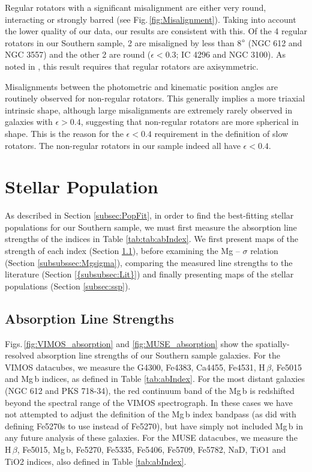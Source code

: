 			Regular rotators with a significant misalignment are either very round, interacting or strongly barred (see Fig.\,\ref{fig:Misalignment}). Taking into account the lower quality of our data, our results are consistent with this. Of the 4 regular rotators in our Southern sample, 2 are misaligned by less than 8$\degree$ (NGC 612 and NGC 3557) and the other 2 are round ($\epsilon < 0.3$; IC 4296 and NGC 3100). As noted in \citet{Cappellari2016}, this result requires that regular rotators are axisymmetric.

			Misalignments between the photometric and kinematic position angles are routinely observed for non-regular rotators. This generally implies a more triaxial intrinsic shape, although large misalignments are extremely rarely observed in galaxies with $\epsilon > 0.4$, suggesting that non-regular rotators are more spherical in shape. This is the reason for the $\epsilon < 0.4$ requirement in the definition of slow rotators. The non-regular rotators in our sample indeed all have $\epsilon < 0.4$.


\section{Stellar Population}
	\label{sec:pop}
	As described in Section \ref{subsec:PopFit}, in order to find the best-fitting stellar populations for our Southern sample, we must first measure the absorption line strengths of the indices in Table \ref{tab:tab:abIndex}. We first present maps of the strength of each index (Section \ref{subsec:absorption}), before examining the Mg -- $\sigma$ relation (Section \ref{subsubssec:Mgsigma}), comparing the measured line strengths to the literature (Section \ref{{subsubsec:Lit}}) and finally presenting maps of the stellar populations (Section \ref{subsec:ssp}).

	\subsection{Absorption Line Strengths}
		\label{subsec:absorption}

		Figs.\,\ref{fig:VIMOS_absorption} and \ref{fig:MUSE_absorption} show the spatially-resolved absorption line strengths of our Southern sample galaxies. For the VIMOS datacubes, we measure the G4300, Fe4383, Ca4455, Fe4531, H\,$\beta$, Fe5015 and Mg\,b indices, as defined in Table \ref{tab:abIndex}. For the most distant galaxies (NGC 612 and PKS 718-34), the red continuum band of the Mg\,b is redshifted beyond the spectral range of the VIMOS spectrograph. In these cases we have not attempted to adjust the definition of the Mg\,b index bandpass (as \citealt{Kuntschner2006} did with defining Fe5270s to use instead of Fe5270), but have simply not included Mg\,b in any future analysis of these galaxies. For the MUSE datacubes, we measure the H\,$\beta$, Fe5015, Mg\,b, Fe5270, Fe5335, Fe5406, Fe5709, Fe5782, NaD, TiO1 and TiO2 indices, also defined in Table \ref{tab:abIndex}.

